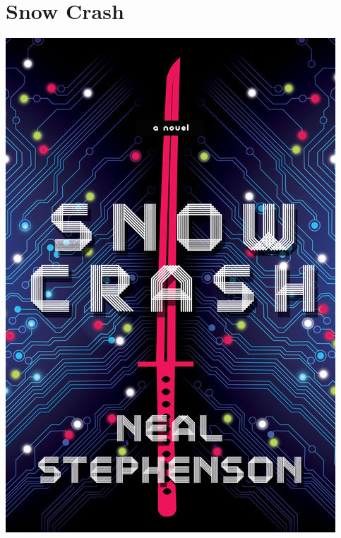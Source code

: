 \documentclass{tufte-handout}
\makeatletter
\newcommand{\varcaption}[2][0pt]{%
  \gsetlength{\@tufte@caption@vertical@offset}{-#1}%
  \gdef\@tufte@stored@varcaption{#2}%
}
\gdef\@tufte@stored@varcaption{} %
\makeatother
\begin{document}
\section*{Snow Crash}
\begin{marginfigure}[\baselineskip]
   \includegraphics[width=\linewidth]{images/snow_crash.jpg}
   \varcaption{\href{https://www.penguinrandomhouse.com/books/172832/snow-crash-by-neal-stephenson/}{Publisher Link}, \href{https://www.amazon.com/Snow-Crash-Neal-Stephenson/dp/0553380958}{Amazon Link}}
\end{marginfigure}
\end{document}
